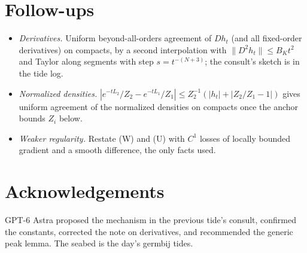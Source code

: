 \documentclass[11pt]{article}
\begin{document}
\section{Follow-ups}

\begin{itemize}
\item \emph{Derivatives.} Uniform beyond-all-orders agreement of $Dh_t$
(and all fixed-order derivatives) on compacts, by a second interpolation
with $\|D^2h_t\| \le B_K t^2$ and Taylor along segments with step
$s = t^{-(N+3)}$; the consult's sketch is in the tide log.
\item \emph{Normalized densities.} $|e^{-tL_2}/Z_2 - e^{-tL_1}/Z_1| \le
Z_2^{-1}(|h_t| + |Z_2/Z_1 - 1|)$ gives uniform agreement of the
normalized densities on compacts once the anchor bounds $Z_i$ below.
\item \emph{Weaker regularity.} Restate (W) and (U) with $C^1$ losses of
locally bounded gradient and a smooth difference, the only facts used.
\end{itemize}

\section*{Acknowledgements}

GPT-6 Astra proposed the mechanism in the previous tide's consult,
confirmed the constants, corrected the note on derivatives, and
recommended the generic peak lemma. The seabed is the day's germbij
tides.
\end{document}
